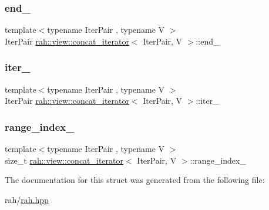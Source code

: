\subsubsection{\texorpdfstring{end\_}{end\_}}
{\footnotesize\ttfamily template$<$typename Iter\+Pair , typename V $>$ \\
Iter\+Pair \mbox{\hyperlink{structrah_1_1view_1_1concat__iterator}{rah\+::view\+::concat\+\_\+iterator}}$<$ Iter\+Pair, V $>$\+::end\+\_\+}

\mbox{\label{structrah_1_1view_1_1concat__iterator_affb17b45b66a04b01962c8b84dc20c43}} 
\subsubsection{\texorpdfstring{iter\_}{iter\_}}
{\footnotesize\ttfamily template$<$typename Iter\+Pair , typename V $>$ \\
Iter\+Pair \mbox{\hyperlink{structrah_1_1view_1_1concat__iterator}{rah\+::view\+::concat\+\_\+iterator}}$<$ Iter\+Pair, V $>$\+::iter\+\_\+}

\mbox{\label{structrah_1_1view_1_1concat__iterator_af57a6e3b1baf3641831378c7919e4256}} 
\subsubsection{\texorpdfstring{range\_index\_}{range\_index\_}}
{\footnotesize\ttfamily template$<$typename Iter\+Pair , typename V $>$ \\
size\+\_\+t \mbox{\hyperlink{structrah_1_1view_1_1concat__iterator}{rah\+::view\+::concat\+\_\+iterator}}$<$ Iter\+Pair, V $>$\+::range\+\_\+index\+\_\+}



The documentation for this struct was generated from the following file\+:\begin{DoxyCompactItemize}
\item 
rah/\mbox{\hyperlink{rah_8hpp}{rah.\+hpp}}\end{DoxyCompactItemize}
